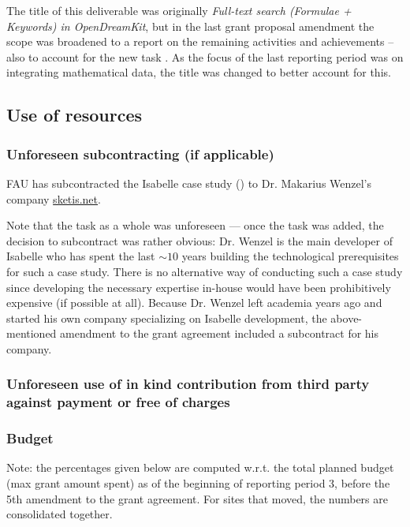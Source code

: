 The title of this deliverable was originally \emph{Full-text search
  (Formulae + Keywords) in OpenDreamKit}, but in the last grant
proposal amendment the scope was broadened to a report on the
remaining  activities and achievements -- also to
account for the new task . As the focus of
the last reporting period was on integrating mathematical data, the title was changed to better account for this.

\subsection{Use of resources}

\subsubsection{Unforeseen subcontracting (if applicable)}
FAU has subcontracted the Isabelle case study () to Dr. Makarius Wenzel's company \url{sketis.net}.

Note that the task as a whole was unforeseen --- once the task was added, the decision to subcontract was rather obvious:
Dr. Wenzel is the main developer of Isabelle who has spent the last $\sim 10$ years building the technological prerequisites for such a case study.
There is no alternative way of conducting such a case study since developing the necessary expertise in-house would have been prohibitively expensive (if possible at all).
Because Dr. Wenzel left academia years ago and started his own company
specializing on Isabelle development, the above-mentioned amendment to
the grant agreement included a subcontract for his company.

\subsubsection{Unforeseen use of in kind contribution from third party against payment or free of charges}

\subsubsection{Budget}

Note: the percentages given below are computed w.r.t. the total
planned budget (max grant amount spent) as of the beginning of
reporting period 3, before the 5th amendment to the grant agreement.
For sites that moved, the numbers are consolidated together.

